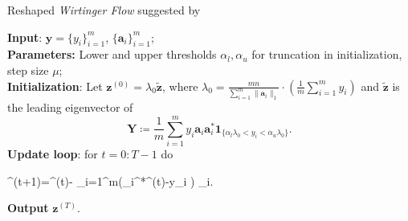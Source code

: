 	\begin{algorithm}
	\caption{Reshaped \emph{Wirtinger Flow} suggested by \cite{reshaped_and_incrementally_reshaped_wirtinger_flow}}
		\textbf{Input}: $\boldsymbol{y}=\{y_i\}_{i=1}^m$, $\{\boldsymbol{a}_i\}_{i=1}^m$; \\
		\textbf{Parameters:}  Lower and upper thresholds $\alpha_l,\alpha_u$ for  truncation in initialization, step size $\mu$;\\
		\textbf{Initialization}: Let $\boldsymbol{z}^{(0)}=\lambda_0 \tilde{\boldsymbol{z}}$, where $\lambda_0=\frac{mn}{\sum_{i=1}^m \|\boldsymbol{a}_i\|_1}\cdot \left(\frac{1}{m}\sum_{i=1}^m y_i\right)$ and $\tilde{\boldsymbol{z}}$ is the leading eigenvector of
		\begin{equation}
			\boldsymbol{Y} \coloneqq \frac{1}{m}\sum_{i=1}^m y_i\boldsymbol{a}_i \boldsymbol{a}_i^*\boldsymbol{1}_{\{\alpha_l \lambda_0<y_i< \alpha_u \lambda_0\}}.
		\end{equation}
		\textbf{Update loop}: for $t=0:T-1$ do
		\begin{flalign}
			^{(t+1)}=^{(t)}- \sum_{i=1}^{m}\left(_i^*^{(t)}-y_i\cdot{} \right) _i.
		\end{flalign}
		\textbf{Output} $\boldsymbol{z}^{(T)}$.
	\end{algorithm}

